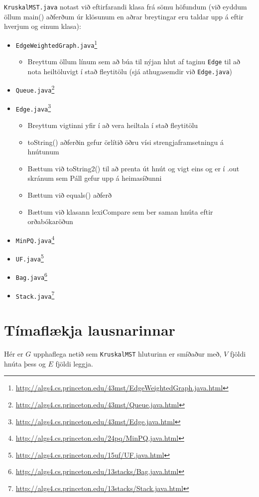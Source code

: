 \documentclass[a4paper,oneside]{article}
\begin{document}
\noindent
\texttt{KruskalMST.java} notast við eftirfarandi klasa frá sömu höfundum (við eyddum öllum main() aðferðum úr klösunum en aðrar breytingar eru taldar upp á eftir hverjum og einum klasa):
\begin{itemize}
    \item \texttt{EdgeWeightedGraph.java}\footnote{\url{http://algs4.cs.princeton.edu/43mst/EdgeWeightedGraph.java.html}}
        \begin{itemize}
            \item Breyttum öllum línum sem að búa til nýjan hlut af taginu \texttt{Edge} til að nota heiltöluvigt í stað fleytitölu (sjá athugasemdir við \texttt{Edge.java})
        \end{itemize}
    \item \texttt{Queue.java}\footnote{\url{http://algs4.cs.princeton.edu/43mst/Queue.java.html}}
    \item \texttt{Edge.java}\footnote{\url{http://algs4.cs.princeton.edu/43mst/Edge.java.html}}
        \begin{itemize}
            \item Breyttum vigtinni yfir í að vera heiltala í stað fleytitölu
            \item toString() aðferðin gefur örlítið öðru vísi strengjaframsetningu á hnútunum 
            \item Bættum við toString2() til að prenta út hnút og vigt eins og er í .out skránum sem Páll gefur upp á heimasíðunni
            \item Bættum við equals() aðferð
            \item Bættum við klasann lexiCompare sem ber saman hnúta eftir orðabókaröðun
        \end{itemize}
    \item \texttt{MinPQ.java}\footnote{\url{http://algs4.cs.princeton.edu/24pq/MinPQ.java.html}}
    \item \texttt{UF.java}\footnote{\url{http://algs4.cs.princeton.edu/15uf/UF.java.html}}
    \item \texttt{Bag.java}\footnote{\url{http://algs4.cs.princeton.edu/13stacks/Bag.java.html}}
    \item \texttt{Stack.java}\footnote{\url{http://algs4.cs.princeton.edu/13stacks/Stack.java.html}}
\end{itemize}


\section{Tímaflækja lausnarinnar}
Hér er $G$ upphaflega netið sem \texttt{KruskalMST} hluturinn er smíðaður með, $V$ fjöldi hnúta þess og $E$ fjöldi leggja. \\
\end{document}
